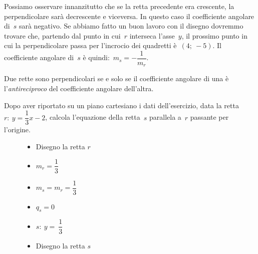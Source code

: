 Possiamo osservare innanzitutto che se la retta precedente era crescente, la 
perpendicolare sarà decrescente e viceversa. In questo caso il coefficiente 
angolare di~\(s\) sarà negativo. 
Se abbiamo fatto un buon lavoro con il disegno dovremmo trovare che, partendo 
dal punto in cui~\(r\) interseca l'asse~\(y\), il 
prossimo punto in cui la perpendicolare passa per l'incrocio dei quadretti 
è~\((4;~-5)\). Il coefficiente angolare di~\(s\) è 
quindi:~\(m_s = - \dfrac{1}{m_r}\).

\begin{definizione}
Due rette sono perpendicolari se e solo se il coefficiente angolare di 
una è l'\emph{antireciproco} del coefficiente angolare dell'altra.
\end{definizione}

 \begin{esempio}
Dopo aver riportato su un piano cartesiano i dati dell'esercizio,
data la retta~\(r:~y = \dfrac{1}{3} x-2\), calcola l'equazione della 
retta~\(s\) parallela a~\(r\) passante per l'origine.

\begin{inaccessibleblock}
 \begin{figure}[h]
\centering \hspace{-5mm}
 \begin{minipage}[]{.40\textwidth}
  \begin{itemize}
  \item Disegno la retta \(r\)
  \item \(m_r = \dfrac{1}{3}\)
  \item \(m_s = m_r = \dfrac{1}{3}\)
  \item \(q_s = 0\)
  \item \(s:~ y=~\dfrac{1}{3}\)
  \item Disegno la retta \(s\)
  \end{itemize}
 \end{minipage}
 \begin{minipage}[]{.60\textwidth}
   \centering \esempioparall
 \end{minipage}
\label{fig:esempioparall}
\end{figure}
\end{inaccessibleblock}
 \end{esempio}
 
